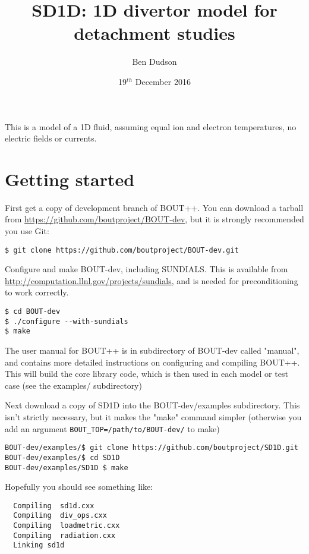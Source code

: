 \documentclass[12pt,a4paper]{article}
\title{ SD1D: 1D divertor model for detachment studies }%
\author{ Ben Dudson }%
\date{ 19$^{th}$ December 2016 }%
\begin{document}
\maketitle %
\thispagestyle{fancy}%

This is a model of a 1D fluid, assuming equal ion and electron temperatures, no electric fields or currents. 

\section{Getting started}

First get a copy of development branch of BOUT++. You can download a tarball from \url{https://github.com/boutproject/BOUT-dev}, but it is strongly recommended you use Git:

\begin{verbatim}
$ git clone https://github.com/boutproject/BOUT-dev.git
\end{verbatim}

Configure and make BOUT-dev, including SUNDIALS. This is available from \url{http://computation.llnl.gov/projects/sundials}, and is needed for preconditioning to work correctly.

\begin{verbatim}
$ cd BOUT-dev
$ ./configure --with-sundials
$ make
\end{verbatim}

The user manual for BOUT++ is in subdirectory of BOUT-dev called "manual", and contains more detailed
instructions on configuring and compiling BOUT++.
This will build the core library code, which is then used in each model or test case (see the examples/ subdirectory)

Next download a copy of SD1D into the BOUT-dev/examples subdirectory. This isn't strictly necessary, but it makes the "make" command simpler (otherwise you add an argument \texttt{BOUT\_TOP=/path/to/BOUT-dev/} to make)
\begin{verbatim}
BOUT-dev/examples/$ git clone https://github.com/boutproject/SD1D.git
BOUT-dev/examples/$ cd SD1D
BOUT-dev/examples/SD1D $ make
\end{verbatim}

Hopefully you should see something like:

\begin{verbatim}
  Compiling  sd1d.cxx
  Compiling  div_ops.cxx
  Compiling  loadmetric.cxx
  Compiling  radiation.cxx
  Linking sd1d
\end{verbatim}
\end{document}
